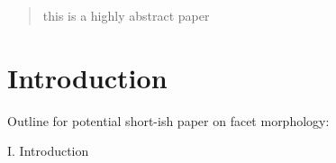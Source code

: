 \begin{abstract}
this is a highly abstract paper
\end{abstract}

%
%

%



%
%
%


\section{Introduction}
\label{sec:intro}


Outline for potential short-ish paper on facet morphology:


I. Introduction

